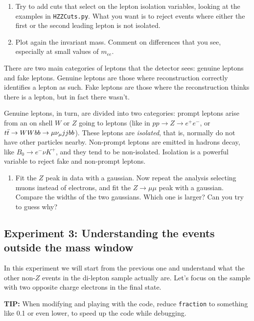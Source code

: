 \begin{enumerate} [resume]
\item  Try to add cuts that select on the lepton isolation variables, looking at the examples in  \verb|HZZCuts.py|. What you want is to reject events where either the first or the second leading lepton is not isolated. 
\item Plot again the invariant mass. Comment on differences that you see, especially at small values of $m_{ee}$. 
\end{enumerate}

\begin{remark}
There are two main categories of leptons that the detector sees: genuine leptons and fake leptons. Genuine leptons are those where reconstruction correctly identifies a lepton as such. Fake leptons are those where the reconstruction thinks there is a lepton, but in fact there wasn't. 

Genuine leptons, in turn, are divided into two categories: prompt leptons arise from an on shell $W$ or $Z$ going to leptons (like in $pp\rightarrow Z\rightarrow e^+ e^-$, or $t\bar{t} \rightarrow WWbb \rightarrow \mu \nu_{\mu} jjbb$). These leptons are \textit{isolated}, that is, normally do not have other particles nearby. Non-prompt leptons are emitted in hadrons decay, like $B_0\rightarrow e^-\nu K^+$, and they tend to be non-isolated. Isolation is a powerful variable to reject fake and non-prompt leptons.   
\end{remark}

\begin{enumerate} [resume]
\item Fit the $Z$ peak in data with a gaussian. Now repeat the analysis selecting muons instead of electrons, and fit the $Z\rightarrow \mu\mu$ peak with a gaussian. Compare the widths of the two gaussians. Which one is larger? Can you try to guess why?  
\end{enumerate}

\subsection{Experiment 3: Understanding the events outside the mass window}

In this experiment we will start from the previous one and understand what the other non-$Z$ events in the di-lepton sample actually are. Let's focus on the sample with two opposite charge electrons in the final state. 

\begin{remark}
\textbf{TIP:} When modifying and playing with the code, reduce \verb|fraction| to something like 0.1 or even lower, to speed up the code while debugging.
\end{remark}


